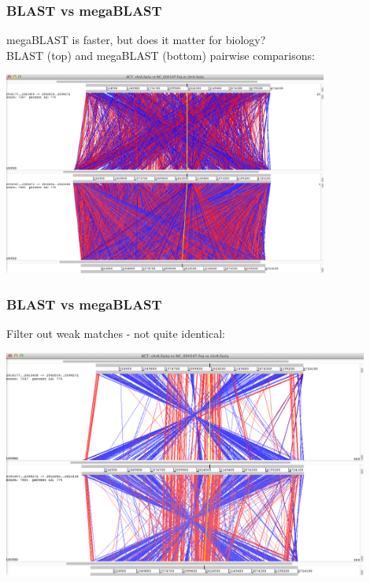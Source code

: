 \begin{frame}
  \frametitle{BLAST vs megaBLAST}
  megaBLAST is faster, but does it matter for biology?\\[0.2cm]
  BLAST (top) and megaBLAST (bottom) pairwise comparisons:
  \begin{center}
    \includegraphics[width=0.8\textwidth]{images/act_wgs6}
  \end{center}    
\end{frame}

\begin{frame}
  \frametitle{BLAST vs megaBLAST}
  Filter out weak matches - not quite identical:
  \begin{center}
    \includegraphics[width=0.9\textwidth]{images/act_wgs7}
  \end{center}    
\end{frame}

